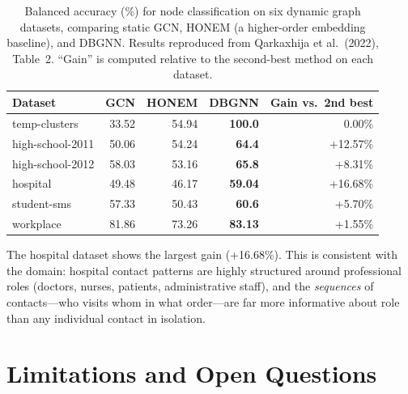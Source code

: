 \begin{table}[H]
\centering
\begin{tabular}{lrrrr}
\toprule
\textbf{Dataset} & \textbf{GCN} & \textbf{HONEM} & \textbf{DBGNN} & \textbf{Gain vs.\ 2nd best} \\
\midrule
temp-clusters   & 33.52 & 54.94 & \textbf{100.0} & 0.00\% \\
high-school-2011 & 50.06 & 54.24 & \textbf{64.4}  & +12.57\% \\
high-school-2012 & 58.03 & 53.16 & \textbf{65.8}  & +8.31\% \\
hospital        & 49.48 & 46.17 & \textbf{59.04} & +16.68\% \\
student-sms     & 57.33 & 50.43 & \textbf{60.6}  & +5.70\% \\
workplace       & 81.86 & 73.26 & \textbf{83.13} & +1.55\% \\
\bottomrule
\end{tabular}
\caption{Balanced accuracy (\%) for node classification on six dynamic graph datasets, comparing
static GCN, HONEM (a higher-order embedding baseline), and DBGNN. Results reproduced from
Qarkaxhija et al.\ (2022), Table~2. ``Gain'' is computed relative to the second-best method
on each dataset.}
\label{tab:dbgnn_results}
\end{table}

The hospital dataset shows the largest gain (+16.68\%). This is consistent with the domain:
hospital contact patterns are highly structured around professional roles (doctors, nurses,
patients, administrative staff), and the \emph{sequences} of contacts---who visits whom in
what order---are far more informative about role than any individual contact in isolation.

\section{Limitations and Open Questions}

